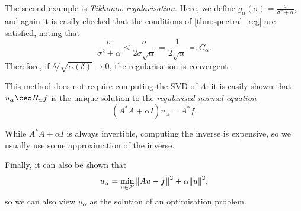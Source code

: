 \begin{example}
	The second example is \emph{Tikhonov regularisation}. Here, we define $g_\alpha(\sigma) = \frac{\sigma}{\sigma^2 + \alpha}$, and again it is easily checked that the conditions of \cref{thm:spectral_reg} are satisfied, noting that
	\[
	\frac{\sigma}{\sigma^2 + \alpha} \leq \frac{\sigma}{2 \sigma \sqrt{\alpha}} = \frac{1}{2\sqrt\alpha} \eqqcolon C_\alpha. 
	\]
	Therefore, if $\delta/\sqrt{\alpha(\delta)} \to 0$, the regularisation is convergent. 
	
	This method does not require computing the SVD of $A$: it is easily shown that $u_\alpha \ceq R_\alpha f$ is the unique solution to the \emph{regularised normal equation}
	\[
	(A^*A + \alpha I) u_\alpha = A^* f. 	
	\]
	
	While $A^* A + \alpha I$ is always invertible, computing the inverse is expensive, so we usually use some approximation of the inverse.
	
	
	Finally, it can also be shown that 
	\[
	u_\alpha = \min_{u \in \mathcal X} \norm{A u - f}^2 + \alpha \norm{u}^2,
	\]
	so we can also view $u_\alpha$ as the solution of an optimisation problem. 
\end{example}